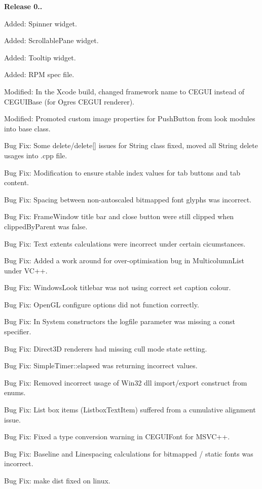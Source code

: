 {\bfseries{Release 0..}}
\begin{DoxyItemize}
\item Added\+: Spinner widget.
\item Added\+: Scrollable\+Pane widget.
\item Added\+: Tooltip widget.
\item Added\+: R\+PM spec file.
\item Modified\+: In the Xcode build, changed framework name to C\+E\+G\+UI instead of C\+E\+G\+U\+I\+Base (for Ogre\textquotesingle{}s C\+E\+G\+UI renderer).
\item Modified\+: Promoted custom image properties for Push\+Button from \textquotesingle{}look\textquotesingle{} modules into base class.
\item Bug Fix\+: Some delete/delete\mbox{[}\mbox{]} issues for String class fixed, moved all String delete usages into .cpp file.
\item Bug Fix\+: Modification to ensure stable index values for tab buttons and tab content.
\item Bug Fix\+: Spacing between non-\/autoscaled bitmapped font glyphs was incorrect.
\item Bug Fix\+: Frame\+Window title bar and close button were still clipped when clipped\+By\+Parent was false.
\item Bug Fix\+: Text extents calculations were incorrect under certain cicumstances.
\item Bug Fix\+: Added a work around for over-\/optimisation bug in Multicolumn\+List under V\+C++.
\item Bug Fix\+: Windows\+Look titlebar was not using correct set caption colour.
\item Bug Fix\+: Open\+GL configure options did not function correctly.
\item Bug Fix\+: In System constructors the logfile parameter was missing a const specifier.
\item Bug Fix\+: Direct3D renderers had missing cull mode state setting.
\item Bug Fix\+: Simple\+Timer\+::elapsed was returning incorrect values.
\item Bug Fix\+: Removed incorrect usage of Win32 dll import/export construct from enums.
\item Bug Fix\+: List box items (Listbox\+Text\+Item) suffered from a cumulative alignment issue.
\item Bug Fix\+: Fixed a type conversion warning in C\+E\+G\+U\+I\+Font for M\+S\+V\+C++.
\item Bug Fix\+: Baseline and Linespacing calculations for bitmapped / static fonts was incorrect.
\item Bug Fix\+: \textquotesingle{}make dist\textquotesingle{} fixed on linux.
\end{DoxyItemize}

